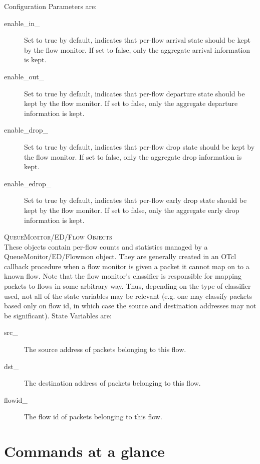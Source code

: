 Configuration Parameters are:
\begin{description}
\item[enable\_in\_] Set to true by default, indicates that per-flow
arrival state should be kept by the flow monitor. If set to false, only
the aggregate arrival information is kept. 

\item[enable\_out\_]
Set to true by default, indicates that per-flow departure state should be
kept by the flow monitor. If set to false, only the aggregate departure
information is kept. 

\item[enable\_drop\_]
Set to true by default, indicates that per-flow drop state should be kept
by the flow monitor. If set to false, only the aggregate drop information
is kept. 

\item[enable\_edrop\_]
Set to true by default, indicates that per-flow early drop state should be
kept by the flow monitor. If set to false, only the aggregate early drop
information is kept. 
\end{description}


\textsc{QueueMonitor/ED/Flow Objects}\\
These objects contain per-flow counts and statistics managed by a
QueueMonitor/ED/Flowmon object. They are generally created in an OTcl
callback procedure when a flow monitor is given a packet it cannot map on
to a known flow. Note that the flow monitor's classifier is responsible
for mapping packets to flows in some arbitrary way. Thus, depending on the
type of classifier used, not all of the state variables may be relevant
(e.g. one may classify packets based only on flow id, in which case the
source and destination addresses may not be significant). 
State Variables are:
\begin{description}
\item[src\_] The source address of packets belonging to this flow. 

\item[dst\_] The destination address of packets belonging to this flow. 

\item[flowid\_] The flow id of packets belonging to this flow. 
\end{description}


\section{Commands at a glance}
\label{sec:queuecommand}

